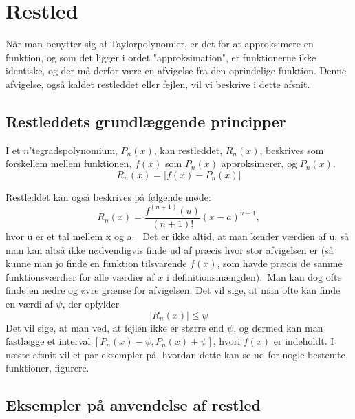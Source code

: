 \chapter{Restled}

Når man benytter sig af Taylorpolynomier, er det for at approksimere en funktion, og som det ligger i ordet "approksimation", er funktionerne ikke identiske, og der må derfor være en afvigelse fra den oprindelige funktion. Denne afvigelse, også kaldet restleddet eller fejlen, vil vi beskrive i dette afsnit.

\section{Restleddets grundlæggende principper}
\begin{defn}
	I et $n$'tegradspolynomium, $P_n(x)$, kan restleddet, $R_n(x)$, beskrives som 			forskellem mellem funktionen, $f(x)$ som $P_n(x)$ approksimerer, og 		$P_n(x)$.\
	\begin{equation*}
		R_n(x)=|f(x)-P_n(x)|
	\end{equation*}
\end{defn}
Restleddet kan også beskrives på følgende møde:
\begin{equation}
	R_n(x)=\frac{f^{(n+1)}(u)}{(n+1)!}(x-a)^{n+1},
\end{equation}
hvor u er et tal mellem x og a. %
\
Det er ikke altid, at man kender værdien af u, så man kan altså ikke nødvendigvis finde ud af præcis hvor stor afvigelsen er (så kunne man jo finde en funktion tilsvarende $f(x)$, som  havde præcis de samme funktionsværdier for alle værdier af $x$ i definitionsmængden).\
Man kan dog ofte finde en nedre og øvre grænse for afvigelsen. Det vil sige, at man ofte kan finde en værdi af $\psi$, der opfylder
\begin{equation}
	|R_n(x)|\leq \psi
\end{equation}
Det vil sige, at man ved, at fejlen ikke er større end $\psi$, og dermed kan man fastlægge et interval $[P_n(x)-\psi,P_n(x)+\psi]$, hvori $f(x)$ er indeholdt. I næste afsnit vil et par eksempler på, hvordan dette kan se ud for nogle bestemte funktioner, figurere.

\section{Eksempler på anvendelse af restled}
